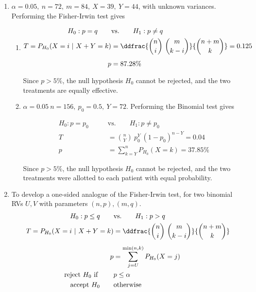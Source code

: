 \begin{enumerate}
	\item $\alpha = 0.05,\ n = 72,\ m = 84,\ X = 39,\ Y = 44$, with unknown variances. Performing the Fisher-Irwin test gives
	
	\begin{enumerate}
		\item 
		\begin{align}
			H_0 : p  = q \qquad &\text{vs.} \qquad H_1 : p  \neq q \nonumber \\
			T = P_{H_0}(X = i\ |\ X+Y = k) &= \ddfrac{\binom{n}{i}\ \binom{m}{k-i}}{\binom{n+m}{k}} = 0.125 \nonumber \\[1ex]
			p &= 87.28\%
		\end{align}
		
		Since $ p > 5\% $, the null hypothesis $ H_0 $ cannot be rejected, and the two treatments are equally effective.
		
	
		\item $\alpha = 0.05\ n = 156,\ p_0 = 0.5,\ Y = 72$. Performing the Binomial test gives
		
		\begin{align}
			H_0 : p = p_0 \qquad &\text{vs.} \qquad H_1 : p \neq p_0 \nonumber \\
			T &= \binom{n}{Y}\ p_0^Y\ (1-p_0)^{n-Y}  = 0.04 \nonumber \\
			p &= \sum\limits_{k = Y}^{n} P_{H_0}(X = k) = 37.85\%
		\end{align}
	
		Since $ p > 5\% $, the null hypothesis $ H_0 $ cannot be rejected, and the two treatments were allotted to each patient with equal probability.
	\end{enumerate}

	\item To develop a one-sided analogue of the Fisher-Irwin test, for two binomial RVs $ U, V $ with parameters $ (n, p) , (m, q)$.
	\begin{align}
		H_0 : p \leq q \qquad &\text{vs.} \qquad H_1 : p > q \nonumber \\
		T = P_{H_0}(X = i\ |\ X+Y = k) &= \ddfrac{\binom{n}{i}\ \binom{m}{k-i}}{\binom{n+m}{k}} \nonumber \\[1ex]
		p &= \sum\limits_{j = U}^{\min(n, k)} P_{H_0}(X = j) \nonumber \\
		\text{reject $ H_0 $ if } \qquad & p \leq \alpha  \nonumber \\
		\text{accept $ H_0 $} \qquad & \text{otherwise} \nonumber \\
	\end{align}
	

\end{enumerate}
